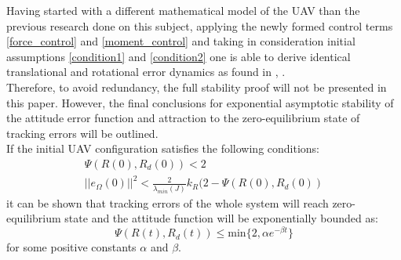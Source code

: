 Having started with a different mathematical model of the UAV than the previous research done on this subject, applying the newly formed control terms \ref{force_control} and \ref{moment_control} and taking in consideration initial assumptions \ref{condition1} and \ref{condition2} one is able to derive identical translational and rotational error dynamics as found in \cite{LeeClanak1}, \cite{LeeClanak4}. \\
Therefore, to avoid redundancy, the full stability proof will not be presented in this paper. However, the final conclusions for exponential asymptotic stability of the attitude error function and attraction to the zero-equilibrium state of tracking errors will be outlined. \\

If the initial UAV configuration satisfies the following conditions:
\begin{gather}
	\Psi (R(0), R_d(0)) < 2 \\
	||e_\Omega(0)||^2 < \frac{2}{\lambda_{min}(J)}k_R(2 - \Psi(R(0), R_d(0))
\end{gather}
it can be shown that tracking errors of the whole system will reach zero-equilibrium state and the attitude function will be exponentially bounded as:
\begin{equation}
	\Psi(R(t), R_d(t)) \leq \text{min}\{2, \alpha e^{-\beta t} \}
\end{equation}
for some positive constants $\alpha$ and $\beta$.
